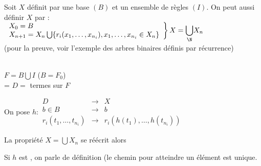 Soit $X$ définit  par une base $(B)$ et un ensemble de règles $(I)$. On peut aussi définir $X$ par  : \\
$\left. \begin{array}{l}
	X_0=B \\
	X_{n+1} = X_n\bigcup \{r_i(x_1,\ldots,x_{n_i}),x_1,\ldots,x_{n_i}\in X_n\}
\end{array} \right\} X=\displaystyle{\bigcup_{\N}}X_n$\\
(pour la preuve, voir l'exemple des arbres binaires définis par récurrence)\\

\par

\\
$F=B\bigcup I$ ($B=F_0$) \\
 = $D=$ termes sur $F$\\
\par
On pose $h : \begin{array}{lcl}
	D & \longrightarrow & X \\
	b\in B & \longrightarrow & b \\
	r_i(t_1,\ldots,t_{n_i}) & \longrightarrow & r_i(h(t_1),\ldots, h(t_{n_i})) 
\end{array}$\\
\par
La propriété $X=\bigcup X_n$ se réécrit alors  \\

\par
Si $h$ est , on parle de définition  (le chemin pour atteindre un élément est unique.
